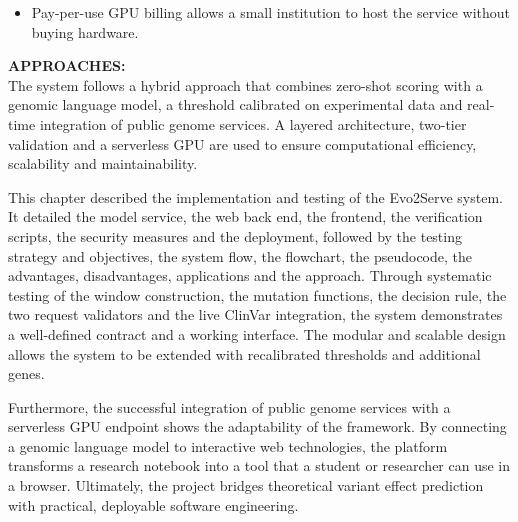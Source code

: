 \begin{itemize}
\item Pay-per-use GPU billing allows a small institution to host the service without buying hardware.
\end{itemize}

\textbf{APPROACHES:}\\
The system follows a hybrid approach that combines zero-shot scoring with a genomic language model, a threshold calibrated on experimental data and real-time integration of public genome services. A layered architecture, two-tier validation and a serverless GPU are used to ensure computational efficiency, scalability and maintainability.

This chapter described the implementation and testing of the Evo2Serve system. It detailed the model service, the web back end, the frontend, the verification scripts, the security measures and the deployment, followed by the testing strategy and objectives, the system flow, the flowchart, the pseudocode, the advantages, disadvantages, applications and the approach. Through systematic testing of the window construction, the mutation functions, the decision rule, the two request validators and the live ClinVar integration, the system demonstrates a well-defined contract and a working interface. The modular and scalable design allows the system to be extended with recalibrated thresholds and additional genes.

Furthermore, the successful integration of public genome services with a serverless GPU endpoint shows the adaptability of the framework. By connecting a genomic language model to interactive web technologies, the platform transforms a research notebook into a tool that a student or researcher can use in a browser. Ultimately, the project bridges theoretical variant effect prediction with practical, deployable software engineering.
